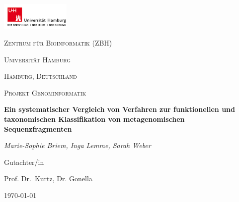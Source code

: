 \documentclass[10pt, a4paper]{report}[08.12.2015]
\begin{document}
  \begin{titlepage}
	\centering
	\includegraphics[width=0.25\textwidth]{secondlogo.png}\par\vspace{1cm}
	{\scshape\LARGE Zentrum f\"ur Bioinformatik (ZBH)\par}
	{\scshape\LARGE Universit\"at Hamburg \par}
	{\scshape\LARGE Hamburg, Deutschland \par}
	\vspace{1cm}
	{\scshape\Large Projekt Genominformatik\par}
	\vspace{1.5cm}
	{\huge\bfseries Ein systematischer Vergleich von Verfahren zur 					funktionellen und taxonomischen Klassifikation von metagenomischen 				Sequenzfragmenten\par}
	\vspace{2cm}
	{\Large\itshape Marie-Sophie Briem, Inga Lemme, Sarah Weber\par}
	\vfill
	Gutachter/in\par
	Prof. Dr.~Kurtz, Dr. Gonella 

	\vfill

	{\large \today\par}
\end{titlepage}

  \newpage
  \tableofcontents
  \newpage
  \listoffigures
  \newpage
\end{document}
